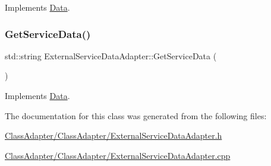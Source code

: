 Implements \mbox{\hyperlink{class_data_a0e2c25ed28d2e48b65f3c187ab0e5fa8}{Data}}.

\mbox{\label{class_external_service_data_adapter_aef7b123ab3e636ec263b609dae8bc4e7}} 
\subsubsection{\texorpdfstring{GetServiceData()}{GetServiceData()}\hspace{0.1cm}{\footnotesize\ttfamily [2/2]}}
{\footnotesize\ttfamily std\+::string External\+Service\+Data\+Adapter\+::\+Get\+Service\+Data (\begin{DoxyParamCaption}\item[{\mbox{\hyperlink{_class_adapter_2_class_adapter_2_data_8h_aacb79576e5cf053ee9c93cb9d665e32b}{T\+Y\+P\+ES}}}]{ }\end{DoxyParamCaption})\hspace{0.3cm}{\ttfamily [virtual]}}



Implements \mbox{\hyperlink{class_data_a0e2c25ed28d2e48b65f3c187ab0e5fa8}{Data}}.



The documentation for this class was generated from the following files\+:\begin{DoxyCompactItemize}
\item 
\mbox{\hyperlink{_class_adapter_2_class_adapter_2_external_service_data_adapter_8h}{Class\+Adapter/\+Class\+Adapter/\+External\+Service\+Data\+Adapter.\+h}}\item 
\mbox{\hyperlink{_class_adapter_2_class_adapter_2_external_service_data_adapter_8cpp}{Class\+Adapter/\+Class\+Adapter/\+External\+Service\+Data\+Adapter.\+cpp}}\end{DoxyCompactItemize}
